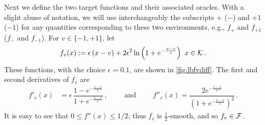 Next we define the two target functions and their associated oracles. With a slight abuse of notation, we will use interchangeably the subscripts $+$ ($-$) and $+1$ ($-1$) for any quantities corresponding to these two environments, e.g., $f_+$ and $f_{+1}$ ($f_-$ and $f_{-1}$).
For $v \in \{-1,+1\}$, let
\begin{align*}
f_v(x) :=  \epsilon\left( x-v\right)+2\epsilon^2 \ln\left(1+e^{-\frac{x-v}{\epsilon}}  \right)
\,\, x \in \mathcal{K}\,.
\end{align*}
These functions, with the choice $\epsilon=0.1$, are shown in \cref{fig:lbfvdiff}. The first and second derivatives of $f_v$ are
\begin{align*}
f'_v(x) &=\epsilon\, \dfrac{1-e^{-\frac{x-v}{\epsilon}}}{1+e^{-\frac{x-v}{\epsilon}}} \,, \qquad \text{ and } \qquad
f''_v(x) = \dfrac{2e^{-\frac{x-v}{\epsilon}} }{\left(  1+e^{-\frac{x-v}{\epsilon}}\right)^2}  \,.
\end{align*}
It is easy to see that $0 \le f''(x) \le 1/2$; thus $f_v$ is $\frac{1}{2}$-smooth, and so $f_v\in \mathcal{F}$.

